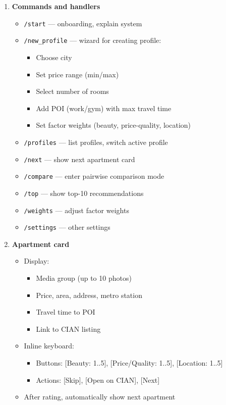 \documentclass[12pt,a4paper]{article}
\begin{document}
\begin{enumerate}
    \item \textbf{Commands and handlers}
    \begin{itemize}
        \item \texttt{/start} — onboarding, explain system
        \item \texttt{/new\_profile} — wizard for creating profile:
        \begin{itemize}
            \item Choose city
            \item Set price range (min/max)
            \item Select number of rooms
            \item Add POI (work/gym) with max travel time
            \item Set factor weights (beauty, price-quality, location)
        \end{itemize}
        \item \texttt{/profiles} — list profiles, switch active profile
        \item \texttt{/next} — show next apartment card
        \item \texttt{/compare} — enter pairwise comparison mode
        \item \texttt{/top} — show top-10 recommendations
        \item \texttt{/weights} — adjust factor weights
        \item \texttt{/settings} — other settings
    \end{itemize}
    
    \item \textbf{Apartment card}
    \begin{itemize}
        \item Display:
        \begin{itemize}
            \item Media group (up to 10 photos)
            \item Price, area, address, metro station
            \item Travel time to POI
            \item Link to CIAN listing
        \end{itemize}
        \item Inline keyboard:
        \begin{itemize}
            \item Buttons: [Beauty: 1..5], [Price/Quality: 1..5], [Location: 1..5]
            \item Actions: [Skip], [Open on CIAN], [Next]
        \end{itemize}
        \item After rating, automatically show next apartment
    \end{itemize}
    

\end{enumerate}
\end{document}
